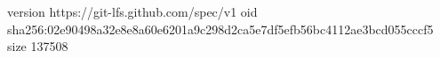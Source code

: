 version https://git-lfs.github.com/spec/v1
oid sha256:02e90498a32e8e8a60e6201a9c298d2ca5e7df5efb56bc4112ae3bcd055cccf5
size 137508
